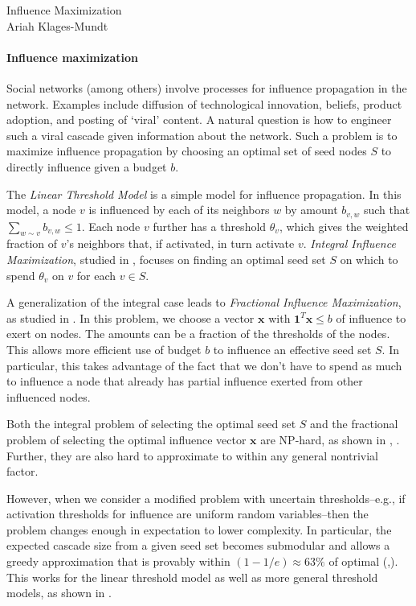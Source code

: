 \documentclass[11pt]{article}
\newcommand{\yourtitle}{Influence Maximization}
\begin{document}
\newcommand{\Half}{\frac{1}{2}}



\begin{center}\LARGE\yourtitle\\
\large Ariah Klages-Mundt
\end{center}

\paragraph{Influence maximization}
Social networks (among others) involve processes for influence propagation in the network. Examples include diffusion of technological innovation, beliefs, product adoption, and posting of `viral' content. A natural question is how to engineer such a viral cascade given information about the network. Such a problem is to maximize influence propagation by choosing an optimal set of seed nodes $S$ to directly influence given a budget $b$.

The {\em Linear Threshold Model} is a simple model for influence propagation. In this model, a node $v$ is influenced by each of its neighbors $w$ by amount $b_{v,w}$ such that $\sum_{w\sim v} b_{v,w} \leq 1$. Each node $v$ further has a threshold $\theta_v$, which gives the weighted fraction of $v$'s neighbors that, if activated, in turn activate $v$. {\em Integral Influence Maximization}, studied in \cite{kempe03}, focuses on finding an optimal seed set $S$ on which to spend $\theta_v$ on $v$ for each $v\in S$.

A generalization of the integral case leads to {\em Fractional Influence Maximization}, as studied in \cite{demaine14}. In this problem, we choose a vector $\mathbf{x}$ with $\mathbf{1}^T \mathbf{x}\leq b$ of influence to exert on nodes. The amounts can be a fraction of the thresholds of the nodes. This allows more efficient use of budget $b$ to influence an effective seed set $S$. In particular, this takes advantage of the fact that we don't have to spend as much to influence a node that already has partial influence exerted from other influenced nodes.


Both the integral problem of selecting the optimal seed set $S$ and the fractional problem of selecting the optimal influence vector $\mathbf{x}$ are NP-hard, as shown in \cite{kempe03}, \cite{demaine14}. Further, they are also hard to approximate to within any general nontrivial factor.

However, when we consider a modified problem with uncertain thresholds--e.g., if activation thresholds for influence are uniform random variables--then the problem changes enough in expectation to lower complexity. In particular, the expected cascade size from a given seed set becomes submodular and allows a greedy approximation that is provably within $(1-1/e)\approx 63\%$ of optimal (\cite{kempe03},\cite{demaine14}). This works for the linear threshold model as well as more general threshold models, as shown in \cite{mossel07}.
\end{document}
